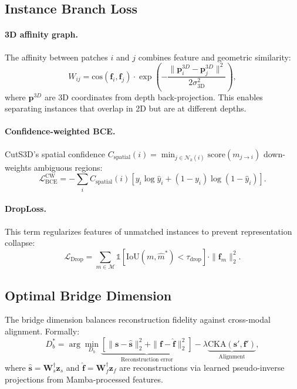 \documentclass[10pt,twocolumn,letterpaper]{article}
\begin{document}
\subsection{Instance Branch Loss}
\label{sec:supp_instance_loss}

\paragraph{3D affinity graph.}
The affinity between patches $i$ and $j$ combines feature and geometric similarity:
\begin{equation}
W_{ij} = \text{cos}(\mathbf{f}_i, \mathbf{f}_j) \cdot \exp\!\left(-\frac{\|\mathbf{p}_i^{3D} - \mathbf{p}_j^{3D}\|^2}{2\sigma_{\text{3D}}^2}\right)\!,
\end{equation}
where $\mathbf{p}^{3D}$ are 3D coordinates from depth back-projection. This enables separating instances that overlap in 2D but are at different depths.

\paragraph{Confidence-weighted BCE.}
CutS3D's spatial confidence $C_{\text{spatial}}(i) = \min_{j \in \mathcal{N}_k(i)} \text{score}(m_{j \to i})$ down-weights ambiguous regions:
\begin{equation}
\mathcal{L}_{\text{BCE}}^{\text{CW}} = -\sum_i C_{\text{spatial}}(i) [y_i \log \hat{y}_i + (1{-}y_i)\log(1{-}\hat{y}_i)].
\end{equation}

\paragraph{DropLoss.}
This term regularizes features of unmatched instances to prevent representation collapse:
\begin{equation}
\mathcal{L}_{\text{Drop}} = \sum_{m \in \mathcal{M}} \mathbb{1}[\text{IoU}(m, \hat{m}^*) < \tau_{\text{drop}}] \cdot \|\mathbf{f}_m\|_2^2.
\end{equation}


\subsection{Optimal Bridge Dimension}
\label{sec:supp_bridge_dim}

The bridge dimension balances reconstruction fidelity against cross-modal alignment. Formally:
\begin{equation}
D_b^* = \arg\min_{D_b} \underbrace{[\|\mathbf{s} - \hat{\mathbf{s}}\|_2^2 + \|\mathbf{f} - \hat{\mathbf{f}}\|_2^2]}_{\text{Reconstruction error}} - \lambda \underbrace{\text{CKA}(\mathbf{s}', \mathbf{f}')}_{\text{Alignment}},
\end{equation}
where $\hat{\mathbf{s}} = \mathbf{W}_s^\dagger \mathbf{z}_s$ and $\hat{\mathbf{f}} = \mathbf{W}_f^\dagger \mathbf{z}_f$ are reconstructions via learned pseudo-inverse projections from Mamba-processed features.
\end{document}
